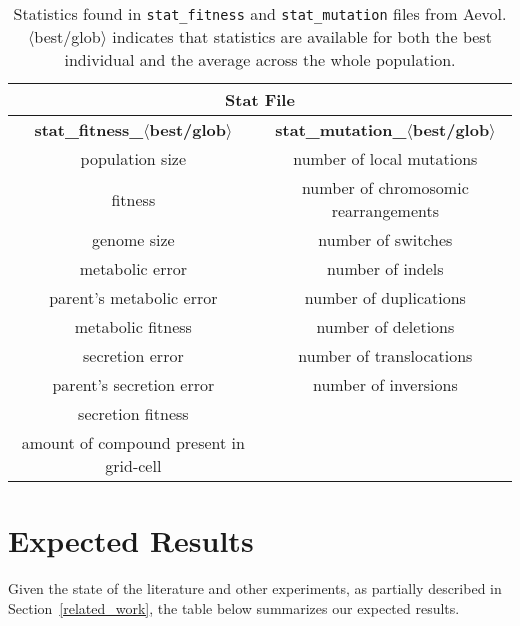 \begin{table}[H]
	\centering
	\begin{tabular}{ |c|c| }
		\hline
		\multicolumn{2}{|c|}{\textbf{Stat File}} \\
		\hline
		\textbf{stat\_fitness\_$\langle$best/glob$\rangle$} &
		\textbf{stat\_mutation\_$\langle$best/glob$\rangle$} \\
		\hline \hline
		population size & number of local mutations \\
		fitness & number of chromosomic rearrangements \\
		genome size & number of switches \\
		metabolic error & number of indels \\
		parent's metabolic error & number of duplications \\
		metabolic fitness & number of deletions \\
		secretion error & number of translocations \\
		parent's secretion error & number of inversions \\
		secretion fitness & \\ 
		amount of compound present in grid-cell & \\
		\hline
	\end{tabular}	
	\caption[Aevol's stats: fitness and mutation]{Statistics found in \texttt{stat\_fitness} and \texttt{stat\_mutation} files from Aevol. $\langle$best/glob$\rangle$ indicates that statistics are available for both the best individual and the average across the whole population.}
	\label{table:aevol_stats_fitness_and_mutation}
\end{table}

\section{Expected Results}\label{sec:expected_results}
Given the state of the literature and other experiments, as partially described in Section~\ref{related_work}, the table below summarizes our expected results. 

